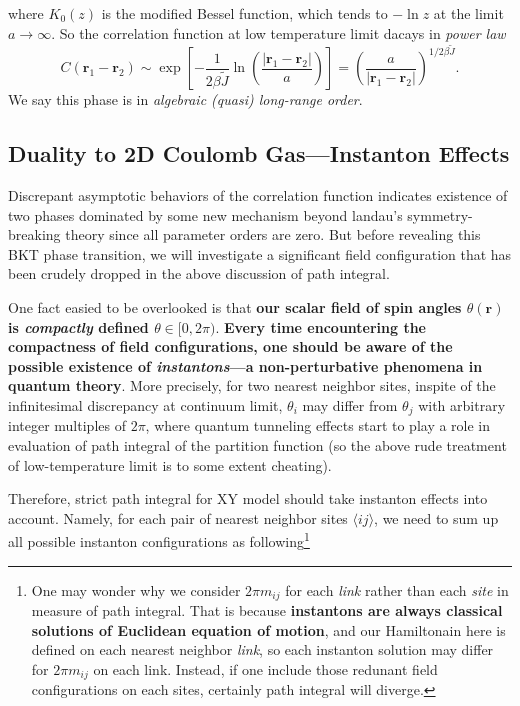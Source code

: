 \documentclass[10pt,nofootinbib]{revtex4}
\begin{document}
			where $K_0(z)$ is the modified Bessel function, which tends to $-\ln z$ at the limit $a\rightarrow\infty$. So the correlation function at low temperature limit dacays in \emph{power law} 
			\begin{equation}\label{1.3.3}
				C(\bm{r}_1-\bm{r}_2)\sim\exp \left[-\dfrac{1}{2\beta \widetilde{J} }\ln \left(\dfrac{|\bm{r}_1-\bm{r}_2|}{a}\right) \right]=\left(\dfrac{a}{|\bm{r}_1-\bm{r}_2|}\right)^{1/2\beta \widetilde{J}}.
			\end{equation}
			We say this phase is in \emph{algebraic (quasi) long-range order}.
	
	\subsection{Duality to 2D Coulomb Gas---Instanton Effects}
		Discrepant asymptotic behaviors of the correlation function indicates existence of two phases dominated by some new mechanism beyond landau's symmetry-breaking theory since all parameter orders are zero. But before revealing this BKT phase transition, we will investigate a significant field configuration that has been crudely dropped in the above discussion of path integral.\par
		One fact easied to be overlooked is that \textbf{\color{red}our scalar field of spin angles $\theta(\bm{r})$ is \emph{compactly} defined $\theta\in[0,2\pi)$}. \textbf{Every time encountering the compactness of field configurations, one should be aware of the possible existence of \emph{instantons}---a non-perturbative phenomena in quantum theory}. More precisely, for two nearest neighbor sites, inspite of the infinitesimal discrepancy at continuum limit, $\theta_i$ may differ from $\theta_j$ with arbitrary integer multiples of $2\pi$, where quantum tunneling effects start to play a role in evaluation of path integral of the partition function (so the above rude treatment of low-temperature limit is to some extent cheating).\par
		Therefore, strict path integral for XY model should take instanton effects into account. Namely, for each pair of nearest neighbor sites $\langle ij \rangle$, we need to sum up all possible instanton configurations as following\footnote{One may wonder why we consider $2\pi m_{ij}$ for each \emph{link} rather than each \emph{site} in measure of path integral. That is because \textbf{instantons are always classical solutions of Euclidean equation of motion}, and our Hamiltonain here is defined on each nearest neighbor \emph{link}, so each instanton solution may differ for $2\pi m_{ij}$ on each link. Instead, if one include those redunant field configurations on each sites, certainly path integral will diverge.}
\end{document}
